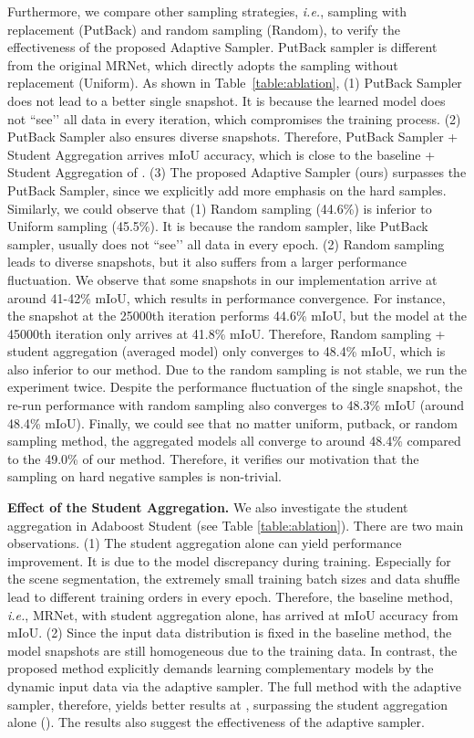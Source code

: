\documentclass[journal]{IEEEtran}
\def\ie{\emph{i.e.}}
\begin{document}
Furthermore, we compare other sampling strategies, \ie, sampling with replacement (PutBack) and random sampling (Random), to verify the effectiveness of the proposed Adaptive Sampler. PutBack sampler is different from the original MRNet, which directly adopts the sampling without replacement (Uniform). 
As shown in Table~\ref{table:ablation}, (1) PutBack Sampler does not lead to a better single snapshot. It is because the learned model does not ``see’’ all data in every iteration, which compromises the training process. (2) PutBack Sampler also ensures diverse snapshots. Therefore, PutBack Sampler + Student Aggregation arrives  mIoU accuracy, which is close to the baseline +  Student Aggregation of . (3) The proposed Adaptive Sampler (ours) surpasses the PutBack Sampler, since we explicitly add more emphasis on the hard samples. Similarly, we could observe that (1) Random sampling (44.6\%) is inferior to Uniform sampling (45.5\%). It is because the random sampler, like PutBack sampler, usually does not ``see’’ all data in every epoch. (2) Random sampling leads to diverse snapshots, but it also suffers from a larger performance fluctuation.  We observe that some snapshots in our implementation arrive at around 41-42\% mIoU, which results in performance convergence.  For instance, the snapshot at the 25000th iteration performs 44.6\% mIoU, but the model at the 45000th iteration only arrives at 41.8\% mIoU. Therefore, Random sampling + student aggregation (averaged model) only converges to 48.4\% mIoU, which is also inferior to our method. Due to the random sampling is not stable, we run the experiment twice. Despite the performance fluctuation of the single snapshot, the re-run performance with random sampling also converges to  48.3\% mIoU (around 48.4\% mIoU). Finally, we could see that no matter uniform, putback, or random sampling method, the aggregated models all converge to around 48.4\% compared to the 49.0\% of our method. Therefore, it verifies our motivation that the sampling on hard negative samples is non-trivial. 

\noindent\textbf{Effect of the Student Aggregation.} 
We also investigate the student aggregation in Adaboost Student (see Table \ref{table:ablation}). There are two main observations. (1) The student aggregation alone can yield performance improvement. It is due to the model discrepancy during training. Especially for the scene segmentation, the extremely small training batch sizes and data shuffle lead to different training orders in every epoch. Therefore, the baseline method, \ie, MRNet, with student aggregation alone, has arrived at  mIoU accuracy from  mIoU. 
(2) Since the input data distribution is fixed in the baseline method, the model snapshots are still homogeneous due to the training data. In contrast, the proposed method explicitly demands learning complementary models by the dynamic input data via the adaptive sampler. The full method with the adaptive sampler, therefore, yields better results at , surpassing the student aggregation alone (). The results also suggest the effectiveness of the adaptive sampler.
\end{document}
